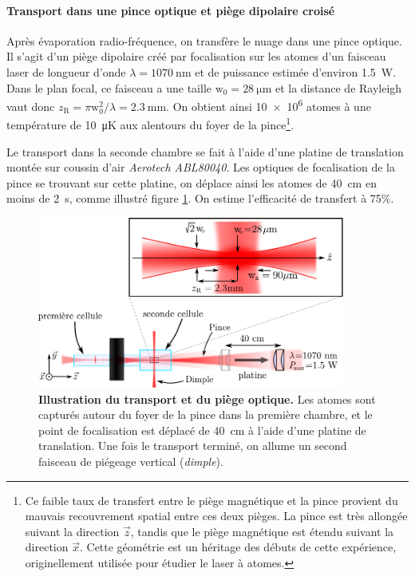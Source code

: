 \paragraph*{Transport dans une pince optique et piège dipolaire croisé}
Après évaporation radio-fréquence, on transfère le nuage dans une pince optique. Il s'agit d'un piège dipolaire créé par focalisation sur les atomes d'un faisceau laser de longueur d'onde $\lambda=\SI{1070}{\nano\metre}$ et de puissance estimée d'environ \SI{1.5}{\watt}. Dans le plan focal, ce faisceau a une taille $\mathrm{w}_{\mathrm{0}}=\SI{28}{\micro\metre}$ et la distance de Rayleigh vaut donc $z_{\mathrm{R}}= \pi \mathrm{w}_{\mathrm{0}}^2 / \lambda=\SI{2.3}{\milli\metre}$. On obtient ainsi \num{10e6} atomes à une température de \SI{10}{\micro\kelvin} aux alentours du foyer de la pince\footnote{Ce faible taux de transfert entre le piège magnétique et la pince provient du mauvais recouvrement spatial entre ces deux pièges. La pince est très allongée suivant la direction $\vec{z}$, tandis que le piège magnétique est étendu suivant la direction $\vec{x}$. Cette géométrie est un héritage des débuts de cette expérience, originellement utilisée pour étudier le laser à atomes.}.

Le transport dans la seconde chambre se fait à l'aide d'une platine de translation montée sur coussin d'air \emph{Aerotech ABL80040}. Les optiques de focalisation de la pince se trouvant sur cette platine, on déplace ainsi les atomes de \SI{40}{\centi\metre} en moins de \SI{2}{\second}, comme illustré figure \ref{fig:piege_optique}. On estime l'efficacité de transfert à 75\%.%

\begin{figure}
\centering
\includegraphics[width=0.9\textwidth]{Fig/BEC_manip/piege_optique2.pdf}
\caption{\textbf{Illustration du transport et du piège optique.} Les atomes sont capturés autour du foyer de la pince dans la première chambre, et le point de focalisation est déplacé de \SI{40}{\centi\metre} à l'aide d'une platine de translation. Une fois le transport terminé, on allume un second faisceau de piégeage vertical (\emph{dimple}).}
\label{fig:piege_optique}
\end{figure}

